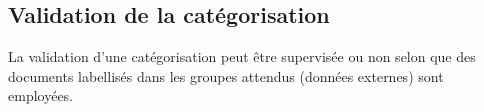 





\subsection{Validation de la catégorisation}
La validation d'une catégorisation peut être supervisée ou non selon que des documents labellisés dans les groupes attendus (données externes) sont employées.

